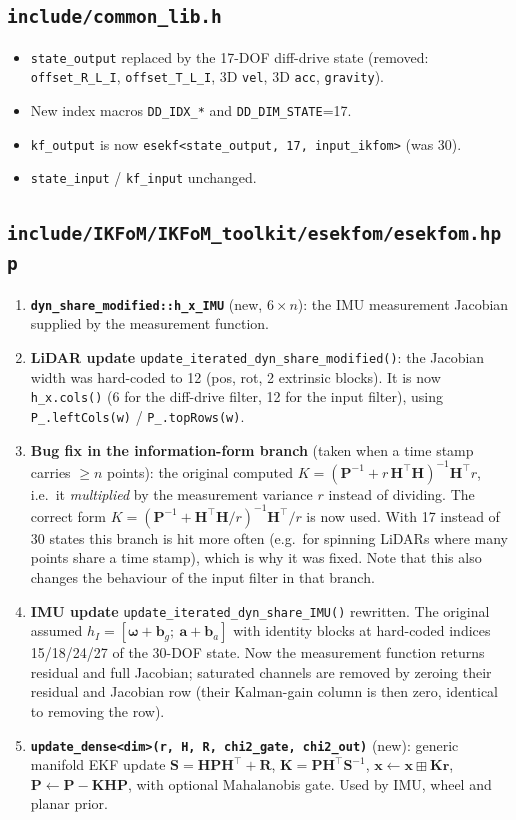 \documentclass[11pt,a4paper]{article}
\newcommand{\f}[1]{\texttt{#1}}
\newcommand{\w}{\bm{\omega}}
\begin{document}
\subsection{\f{include/common\_lib.h}}
\begin{itemize}
\item \f{state\_output} replaced by the 17-DOF diff-drive state (removed: \f{offset\_R\_L\_I},
  \f{offset\_T\_L\_I}, 3D \f{vel}, 3D \f{acc}, \f{gravity}).
\item New index macros \f{DD\_IDX\_*} and \f{DD\_DIM\_STATE}=17.
\item \f{kf\_output} is now \f{esekf<state\_output, 17, input\_ikfom>} (was 30).
\item \f{state\_input} / \f{kf\_input} unchanged.
\end{itemize}

\subsection{\f{include/IKFoM/IKFoM\_toolkit/esekfom/esekfom.hpp}}
\begin{enumerate}
\item \textbf{\f{dyn\_share\_modified::h\_x\_IMU}} (new, $6\times n$): the IMU
  measurement Jacobian supplied by the measurement function.
\item \textbf{LiDAR update} \f{update\_iterated\_dyn\_share\_modified()}: the
  Jacobian width was hard-coded to 12 (pos, rot, 2 extrinsic blocks). It is now
  \f{h\_x.cols()} (6 for the diff-drive filter, 12 for the input filter), using
  \f{P\_.leftCols(w)} / \f{P\_.topRows(w)}.
\item \textbf{Bug fix in the information-form branch} (taken when a time stamp
  carries $\ge n$ points): the original computed
  $K=(\mathbf P^{-1}+r\,\mathbf H^\top\mathbf H)^{-1}\mathbf H^\top r$, i.e.\ it
  \emph{multiplied} by the measurement variance $r$ instead of dividing. The
  correct form $K=(\mathbf P^{-1}+\mathbf H^\top\mathbf H/r)^{-1}\mathbf H^\top/r$
  is now used. With 17 instead of 30 states this branch is hit more often
  (e.g.\ for spinning LiDARs where many points share a time stamp), which is why
  it was fixed. Note that this also changes the behaviour of the input filter in
  that branch.
\item \textbf{IMU update} \f{update\_iterated\_dyn\_share\_IMU()} rewritten. The
  original assumed $h_I=[\w+\mathbf b_g;\ \mathbf a+\mathbf b_a]$ with identity
  blocks at hard-coded indices 15/18/24/27 of the 30-DOF state. Now the
  measurement function returns residual and full Jacobian; saturated channels
  are removed by zeroing their residual and Jacobian row (their Kalman-gain
  column is then zero, identical to removing the row).
\item \textbf{\f{update\_dense<dim>(r, H, R, chi2\_gate, chi2\_out)}} (new):
  generic manifold EKF update $\mathbf S=\mathbf H\mathbf P\mathbf H^\top+\mathbf R$,
  $\mathbf K=\mathbf P\mathbf H^\top\mathbf S^{-1}$, $\mathbf x\leftarrow\mathbf x\boxplus\mathbf K\mathbf r$,
  $\mathbf P\leftarrow\mathbf P-\mathbf K\mathbf H\mathbf P$, with optional
  Mahalanobis gate. Used by IMU, wheel and planar prior.
\end{enumerate}
\end{document}

